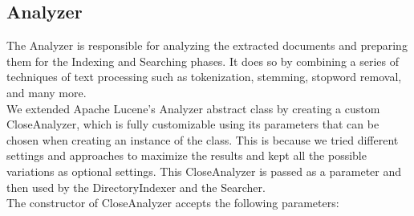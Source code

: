 \subsection{Analyzer}
The Analyzer is responsible for analyzing the extracted documents and preparing them for the Indexing and Searching phases. It does so by combining a series of techniques of text processing such as tokenization, stemming, stopword removal, and many more.\\
We extended Apache Lucene's Analyzer abstract class by creating a custom CloseAnalyzer, which is fully customizable using its parameters that can be chosen when creating an instance of the class. This is because we tried different settings and approaches to maximize the results and kept all the possible variations as optional settings.
This CloseAnalyzer is passed as a parameter and then used by the DirectoryIndexer and the Searcher. \\
The constructor of CloseAnalyzer accepts the following parameters:
